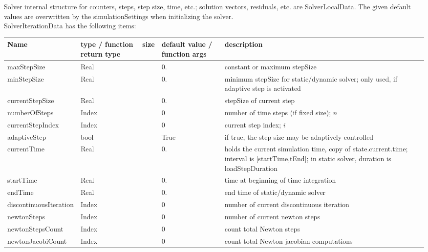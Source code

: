  \label{sec_SolverIterationData}
Solver internal structure for counters, steps, step size, time, etc.; solution vectors, residuals, etc. are SolverLocalData. The given default values are overwritten by the simulationSettings when initializing the solver.\\ 
%
SolverIterationData has the following items:
\begin{center}
  \footnotesize
  \begin{longtable}{| p{4.2cm} | p{2.5cm} | p{0.3cm} | p{3.0cm} | p{6cm} |}
    \hline
    \bf Name & \bf type / function return type & \bf size & \bf default value / function args & \bf description \\ \hline
    maxStepSize &     Real &      &     0. &     constant or maximum stepSize\\ \hline
    minStepSize &     Real &      &     0. &     minimum stepSize for static/dynamic solver; only used, if adaptive step is activated\\ \hline
    currentStepSize &     Real &      &     0. &     stepSize of current step\\ \hline
    numberOfSteps &     Index &      &     0 &     number of time steps (if fixed size); $n$\\ \hline
    currentStepIndex &     Index &      &     0 &     current step index; $i$\\ \hline
    adaptiveStep &     bool &      &     True &     if true, the step size may be adaptively controlled\\ \hline
    currentTime &     Real &      &     0. &     holds the current simulation time, copy of state.current.time; interval is [startTime,tEnd]; in static solver, duration is loadStepDuration\\ \hline
    startTime &     Real &      &     0. &     time at beginning of time integration\\ \hline
    endTime &     Real &      &     0. &     end time of static/dynamic solver\\ \hline
    discontinuousIteration &     Index &      &     0 &     number of current discontinuous iteration\\ \hline
    newtonSteps &     Index &      &     0 &     number of current newton steps\\ \hline
    newtonStepsCount &     Index &      &     0 &     count total Newton steps\\ \hline
    newtonJacobiCount &     Index &      &     0 &     count total Newton jacobian computations\\ \hline

\end{longtable}
\end{center}
